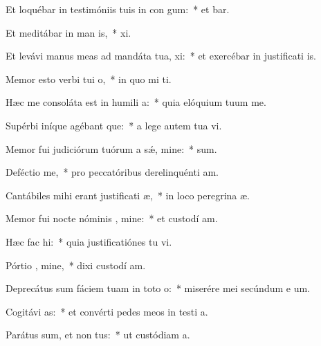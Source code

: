 \item Et loquébar in testimóniis tuis in con gum:~* et  bar.
\item Et meditábar in man is,~*  xi.
\item Et levávi manus meas ad mandáta tua,  xi:~* et exercébar in justificati is.
\item Memor esto verbi tui  o,~* in quo mi  ti.
\item Hæc me consoláta est in humili a:~* quia elóquium tuum  me.
\item Supérbi iníque agébant que:~* a lege autem tua  vi.
\item Memor fui judiciórum tuórum a sǽ, mine:~*   sum.
\item Deféctio  me,~* pro peccatóribus derelinquénti  am.
\item Cantábiles mihi erant justificati æ,~* in loco peregrina æ.
\item Memor fui nocte nóminis , mine:~* et custodí  am.
\item Hæc fac  hi:~* quia justificatiónes tu vi.
\item Pórtio , mine,~* dixi custodí  am.
\item Deprecátus sum fáciem tuam in toto  o:~* miserére mei secúndum e um.
\item Cogitávi  as:~* et convérti pedes meos in testi a.
\item Parátus sum, et non  tus:~* ut custódiam  a.
